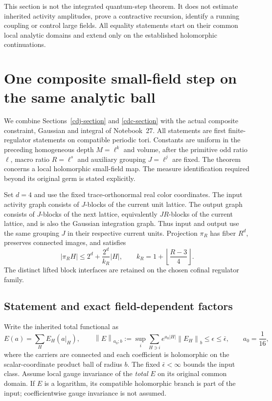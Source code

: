 \documentclass[11pt]{article}
\theoremstyle{remark}
\newcommand{\norm}[1]{\left\|#1\right\|}
\begin{document}
This section is not the integrated quantum-step theorem. It
does not estimate inherited activity amplitudes, prove a
contractive recursion, identify a running coupling or control
large fields. All equality statements start on their common
local analytic domains and extend only on the established
holomorphic continuations.

\section{One composite small-field step on the same analytic ball}
\label{cdm-section}

We combine Sections~\ref{cdj-section} and \ref{cdc-section} with the
actual composite constraint, Gaussian and integral of Notebook~27.
All statements are first finite-regulator statements on compatible
periodic tori. Constants are uniform in the preceding homogeneous
depth $M=\ell^k$ and volume, after the primitive odd ratio $\ell$,
macro ratio $R=\ell^s$ and auxiliary grouping $J=\ell^j$ are fixed.
The theorem concerns a local holomorphic small-field map. The measure
identification required beyond its original germ is stated explicitly.

Set $d=4$ and use the fixed trace-orthonormal real color coordinates.
The input activity graph consists of $J$-blocks of the current
unit lattice. The output graph consists of $J$-blocks of the next
lattice, equivalently $JR$-blocks of the current lattice, and is
also the Gaussian integration graph. Thus input and output use
the same grouping $J$ in their respective current units. Projection
$\pi_R$ has fiber $R^d$, preserves connected images, and satisfies
\begin{equation}
 |\pi_RH|\le 2^d+\frac{2^d}{k_R}|H|,
 \qquad k_R=1+\left\lfloor\frac{R-3}{4}\right\rfloor.
 \label{cdm-compression}
\end{equation}
The distinct lifted block interfaces are retained on the chosen
cofinal regulator family.

\subsection{Statement and exact field-dependent factors}
\label{cdm-statement-section}

Write the inherited total functional as
\begin{equation}
 E(a)=\sum_H E_H(a|_H),\qquad
 \norm{E}_{a_0;b}:=
 \sup_i\sum_{H\ni i}e^{a_0|H|}\norm{E_H}_b
 \le\epsilon\le\bar\epsilon,\qquad a_0=\frac1{16},
 \label{cdm-input}
\end{equation}
where the carriers are connected and each coefficient is holomorphic
on the scalar-coordinate product ball of radius $b$. The fixed
$\bar\epsilon<\infty$ bounds the input class. Assume local gauge
invariance of the \emph{total} $E$ on its original common domain.
If $E$ is a logarithm, its compatible holomorphic branch is part
of the input; coefficientwise gauge invariance is not assumed.
\end{document}
